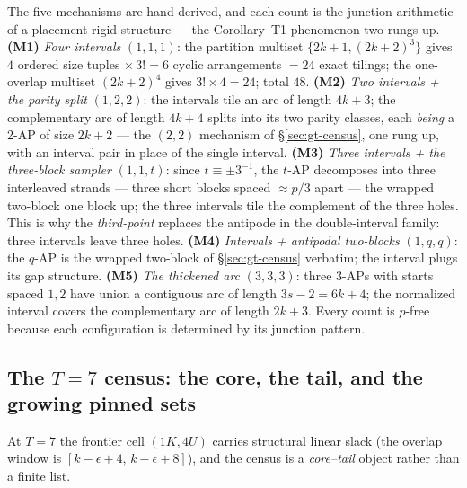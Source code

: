 \documentclass[11pt,a4paper]{article}
\numberwithin{equation}{section}
\theoremstyle{plain}
\theoremstyle{plain}
\theoremstyle{definition}
\theoremstyle{remark}
\begin{document}
The five mechanisms are hand-derived, and each count is the junction
arithmetic of a placement-rigid structure --- the Corollary~T1
phenomenon two rungs up. \textbf{(M1)} \emph{Four intervals} $(1,1,1)$:
the partition multiset $\{2k+1,(2k+2)^3\}$ gives $4$ ordered size
tuples $\times\,3!=6$ cyclic arrangements $=24$ exact tilings; the
one-overlap multiset $(2k+2)^4$ gives $3!\times4=24$; total $48$.
\textbf{(M2)} \emph{Two intervals + the parity split} $(1,2,2)$: the
intervals tile an arc of length $4k+3$; the complementary arc of length
$4k+4$ splits into its two parity classes, each \emph{being} a 2-AP of
size $2k+2$ --- the $(2,2)$ mechanism of \S\ref{sec:gt-census}, one rung
up, with an interval pair in place of the single interval.
\textbf{(M3)} \emph{Three intervals + the three-block sampler}
$(1,1,t)$: since $t\equiv\pm3^{-1}$, the $t$-AP decomposes into three
interleaved strands --- three short blocks spaced $\approx p/3$ apart
--- the wrapped two-block one block up; the three intervals tile the
complement of the three holes. This is why the \emph{third-point}
replaces the antipode in the double-interval family: three intervals
leave three holes. \textbf{(M4)} \emph{Intervals + antipodal
two-blocks} $(1,q,q)$: the $q$-AP is the wrapped two-block of
\S\ref{sec:gt-census} verbatim; the interval plugs its gap structure.
\textbf{(M5)} \emph{The thickened arc} $(3,3,3)$: three 3-APs with
starts spaced $1,2$ have union a contiguous arc of length $3s-2=6k+4$;
the normalized interval covers the complementary arc of length $2k+3$.
Every count is $p$-free because each configuration is determined by its
junction pattern.

\subsection{The \texorpdfstring{$T=7$}{T=7} census: the core, the tail, and the growing pinned sets}

At $T=7$ the frontier cell $(1K,4U)$ carries structural linear slack
(the overlap window is $[k-\epsilon+4,\,k-\epsilon+8]$), and the census
is a \emph{core--tail} object rather than a finite list.
\end{document}
